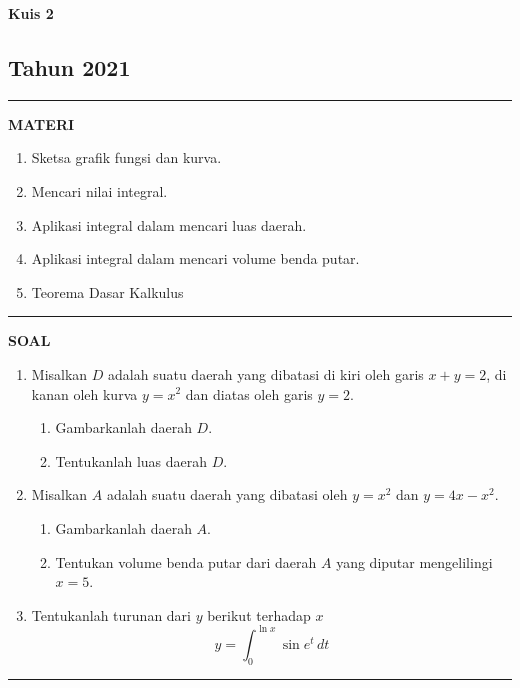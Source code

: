 \begin{flushright}
    \textbf{\Large{Kuis 2}}
    \subsection*{Tahun 2021}
\end{flushright}
\vspace{0.5cm}
\hrule height 2pt
\vspace{0.5cm}
\begin{center}
    \textbf{\large{MATERI}}
    \begin{enumerate}[leftmargin=*, label={\arabic*}.]
        \item Sketsa grafik fungsi dan kurva.
        \item Mencari nilai integral.
        \item Aplikasi integral dalam mencari luas daerah.
        \item Aplikasi integral dalam mencari volume benda putar.
        \item Teorema Dasar Kalkulus
    \end{enumerate}
\end{center}
\vspace{0.2cm}
\hrule height 1pt
\vspace{0.5cm}
\begin{center}
    \textbf{\large{SOAL}}
\end{center}
\begin{enumerate}[leftmargin=*, label={\arabic*}.]
\item Misalkan $D$ adalah suatu daerah yang dibatasi di kiri oleh garis $x+y=2$, 
di kanan oleh kurva $y=x^{2}$ dan diatas oleh garis $y=2$.
\begin{enumerate}[label={\alph*}.]
    \item Gambarkanlah daerah $D$.
    \item Tentukanlah luas daerah $D$.
\end{enumerate}
\item Misalkan $A$ adalah suatu daerah yang dibatasi oleh $y=x^{2}$ dan $y=4x-x^{2}$.
\begin{enumerate}[label={\alph*}.]
    \item Gambarkanlah daerah $A$.
    \item Tentukan volume benda putar dari daerah $A$ yang diputar mengelilingi $x=5$.
\end{enumerate}
\item Tentukanlah turunan dari $y$ berikut terhadap $x$
\[
y = \int_{0}^{\ln x}\sin e^{t}\,dt
\]
\end{enumerate}
\vspace{0.2cm}
\hrule height 1pt
\vspace{0.5cm}

